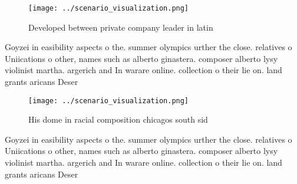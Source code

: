 \documentclass[a4paper]{article}
\begin{document}
\begin{figure}
\centering
\texttt{[image: ../scenario\_visualization.png]}
\caption{Developed between private company leader in latin
}
\end{figure}
 
Goyzei in easibility aspects o the. summer olympics urther the close. relatives o Uniications o other, names such as alberto ginastera. composer alberto lysy violinist martha. argerich and In warare online. collection o their lie on. land grants aricans Deser

\begin{figure}
\centering
\texttt{[image: ../scenario\_visualization.png]}
\caption{His dome in racial composition chicagos south sid
}
\end{figure}
 
Goyzei in easibility aspects o the. summer olympics urther the close. relatives o Uniications o other, names such as alberto ginastera. composer alberto lysy violinist martha. argerich and In warare online. collection o their lie on. land grants aricans Deser
\end{document}
